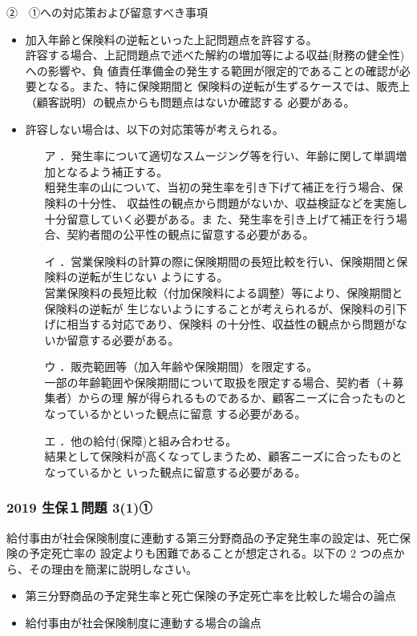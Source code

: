 \documentclass[report,gutter=10mm,fore-edge=10mm,uplatex,dvipdfmx]{jlreq}
\begin{document}
②　①への対応策および留意すべき事項
\begin{itemize}
 \item 加入年齢と保険料の逆転といった上記問題点を許容する。\\
許容する場合、上記問題点で述べた解約の増加等による収益(財務の健全性)への影響や、負
値責任準備金の発生する範囲が限定的であることの確認が必要となる。また、特に保険期間と
保険料の逆転が生ずるケースでは、販売上（顧客説明）の観点からも問題点はないか確認する
必要がある。
 \item 許容しない場合は、以下の対応策等が考えられる。
\begin{itemize}
 \item [ア]．発生率について適切なスムージング等を行い、年齢に関して単調増加となるよう補正する。\\
粗発生率の山について、当初の発生率を引き下げて補正を行う場合、保険料の十分性、
収益性の観点から問題がないか、収益検証などを実施し十分留意していく必要がある。ま
た、発生率を引き上げて補正を行う場合、契約者間の公平性の観点に留意する必要がある。
 \item [イ]．営業保険料の計算の際に保険期間の長短比較を行い、保険期間と保険料の逆転が生じない
ようにする。\\
営業保険料の長短比較（付加保険料による調整）等により、保険期間と保険料の逆転が
生じないようにすることが考えられるが、保険料の引下げに相当する対応であり、保険料
の十分性、収益性の観点から問題がないか留意する必要がある。
 \item [ウ]．販売範囲等（加入年齢や保険期間）を限定する。\\
一部の年齢範囲や保険期間について取扱を限定する場合、契約者（＋募集者）からの理
解が得られるものであるか、顧客ニーズに合ったものとなっているかといった観点に留意
する必要がある。
 \item [エ]．他の給付(保障)と組み合わせる。\\
結果として保険料が高くなってしまうため、顧客ニーズに合ったものとなっているかと
いった観点に留意する必要がある。
\end{itemize}
\end{itemize}
\subsubsection{2019 生保１問題 3(1)①}
給付事由が社会保険制度に連動する第三分野商品の予定発生率の設定は、死亡保険の予定死亡率の
設定よりも困難であることが想定される。以下の 2 つの点から、その理由を簡潔に説明しなさい。
\begin{itemize}
 \item 第三分野商品の予定発生率と死亡保険の予定死亡率を比較した場合の論点
 \item 給付事由が社会保険制度に連動する場合の論点
\end{itemize}
\end{document}
